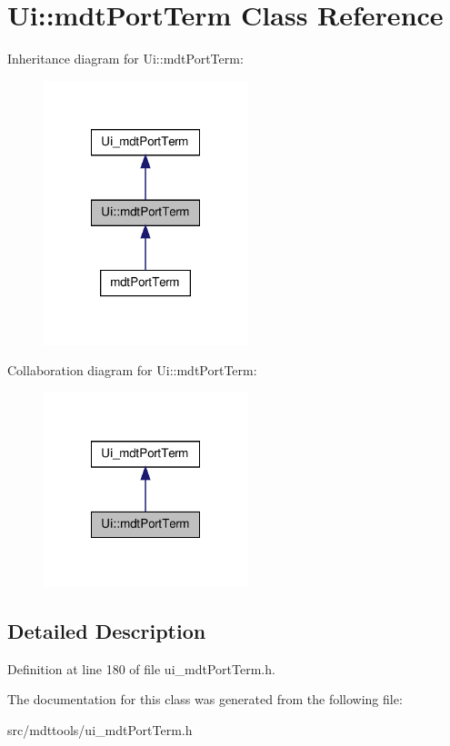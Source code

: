 \hypertarget{class_ui_1_1mdt_port_term}{
\section{Ui::mdtPortTerm Class Reference}
\label{class_ui_1_1mdt_port_term}
}


Inheritance diagram for Ui::mdtPortTerm:\nopagebreak
\begin{figure}[H]
\begin{center}
\leavevmode
\includegraphics[width=168pt]{class_ui_1_1mdt_port_term__inherit__graph}
\end{center}
\end{figure}


Collaboration diagram for Ui::mdtPortTerm:\nopagebreak
\begin{figure}[H]
\begin{center}
\leavevmode
\includegraphics[width=168pt]{class_ui_1_1mdt_port_term__coll__graph}
\end{center}
\end{figure}


\subsection{Detailed Description}


Definition at line 180 of file ui\_\-mdtPortTerm.h.



The documentation for this class was generated from the following file:\begin{DoxyCompactItemize}
\item 
src/mdttools/ui\_\-mdtPortTerm.h\end{DoxyCompactItemize}
